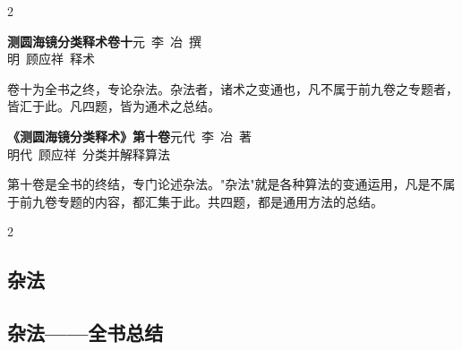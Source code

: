 \documentclass[11pt,a4paper]{article}
\begin{document}
\begin{paracol}{2}

\switchcolumn*
\begin{center}
\noindent\textbf{测圆海镜分类释术卷十}\quad 元~李~冶~撰\\
明~顾应祥~释术
\end{center}

\vspace{0.5em}
\noindent
卷十为全书之终，专论杂法。杂法者，诸术之变通也，凡不属于前九卷之专题者，皆汇于此。凡四题，皆为通术之总结。

\switchcolumn
\begin{center}
\noindent\textbf{《测圆海镜分类释术》第十卷}\quad 元代~李~冶~著\\
明代~顾应祥~分类并解释算法
\end{center}

\vspace{0.5em}
\noindent
第十卷是全书的终结，专门论述杂法。"杂法"就是各种算法的变通运用，凡是不属于前九卷专题的内容，都汇集于此。共四题，都是通用方法的总结。

\end{paracol}

\vspace{0.5em}

\begin{paracol}{2}
\subsection*{\textcolor{sectioncolor}{杂法}}
\switchcolumn
\subsection*{\textcolor{sectioncolor}{杂法——全书总结}}
\end{paracol}

\vspace{0.5em}
\end{document}
